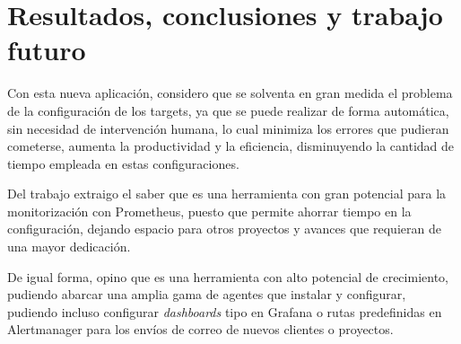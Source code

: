 \chapter{Resultados, conclusiones y trabajo futuro}

Con esta nueva aplicación, considero que se solventa en gran medida el problema de la configuración de los targets, ya que se puede realizar de forma automática, sin necesidad de intervención humana, lo cual minimiza los errores que pudieran cometerse, aumenta la productividad y la eficiencia, disminuyendo la cantidad de tiempo empleada en estas configuraciones.

Del trabajo extraigo el saber que es una herramienta con gran potencial para la monitorización con Prometheus, puesto que permite ahorrar tiempo en la configuración, dejando espacio para otros proyectos y avances que requieran de una mayor dedicación.

De igual forma, opino que es una herramienta con alto potencial de crecimiento, pudiendo abarcar una amplia gama de agentes que instalar y configurar, pudiendo incluso configurar \textit{dashboards} tipo en Grafana o rutas predefinidas en Alertmanager para los envíos de correo de nuevos clientes o proyectos.